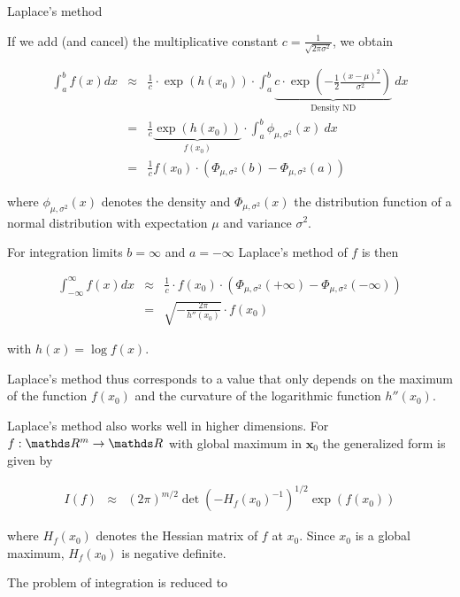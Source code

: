 \begin{vbframe}{Laplace's method}
\framebreak

If we add (and cancel) the multiplicative constant $c = \frac{1}{\sqrt{2\pi\sigma^2}}$, we obtain

\begin{eqnarray*}
\int_a^b f(x) dx &\approx& \frac{1}{c} \cdot \exp\left( h(x_0)\right) \cdot\int_a^b \underbrace{c \cdot \exp\left(-\frac{1}{2} \frac{(x - \mu)^2}{\sigma^2}\right)}_{\text{Density ND}}~dx\\
&=& \frac{1}{c}\underbrace{\exp\left( h(x_0)\right)}_{f(x_0)} \cdot \int_a^b \phi_{\mu, \sigma^2} (x)~dx \\
&=& \frac{1}{c}f(x_0) \cdot \left(\Phi_{\mu, \sigma^2}(b) - \Phi_{\mu, \sigma^2}(a)\right)
\end{eqnarray*}

where $\phi_{\mu, \sigma^2}(x)$ denotes the density and $\Phi_{\mu, \sigma^2}(x)$ the distribution function of a normal distribution with expectation $\mu$ and variance $\sigma^2$.

\framebreak

For integration limits $b = \infty$ and $a = -\infty$ Laplace's method of $f$ is then

\begin{eqnarray*}
\int_{-\infty}^{\infty} f(x) dx &\approx& \frac{1}{c}\cdot f(x_0) \cdot \left(\Phi_{\mu, \sigma^2}(+ \infty) - \Phi_{\mu, \sigma^2}(-\infty)\right) \\
&=& \sqrt{- \frac{2\pi}{h''(x_0)}} \cdot f(x_0)
\end{eqnarray*}

with $h(x) = \log f(x)$.

\lz

Laplace's method thus corresponds to a value that only depends on the maximum of the function $f(x_0)$ and the curvature of the logarithmic function $h''(x_0)$.
\framebreak

Laplace's method also works well in higher dimensions. For $f:\R^{m} \to \R$ with global maximum in $\bm{x}_0$ the generalized form is given by

\begin{eqnarray*}
I(f) &\approx& (2\pi)^{m/2} \det(-H_f(x_0)^{-1})^{1/2} \exp(f(x_0))
\end{eqnarray*}

where $H_f(x_0)$ denotes the Hessian matrix of $f$ at $x_0$. Since $x_0$ is a global maximum, $H_f(x_0)$ is negative definite.

\lz

The problem of integration is reduced to


\end{vbframe}
